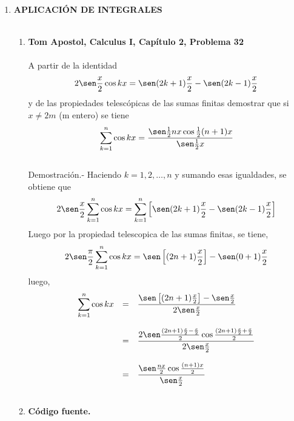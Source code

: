 \begin{enumerate}

\item \textbf{\large APLICACIÓN DE INTEGRALES}\\\\

    \begin{enumerate}[\bfseries a)]

	\item \textbf{\large Tom Apostol, Calculus I, Capítulo 2, Problema 32}\\\\
	A partir de la identidad 
	    $$2\sen \dfrac{x}{2} \cos kx = \sen(2k+1)\dfrac{x}{2} - \sen(2k-1)\dfrac{x}{2}$$
	    y de las propiedades telescópicas de las sumas finitas demostrar que si $x\neq 2m$ (m entero) se tiene
	    $$\sum_{k=1}^n \cos kx = \dfrac{\sen \frac{1}{2}nx\cos \frac{1}{2}(n+1)x}{\sen\frac{1}{2}x}$$\\
	    Demostración.-\; Haciendo $k= 1,2,\ldots, n$ y sumando esas igualdades, se obtiene que
	    $$2\sen \dfrac{x}{2} \sum_{k=1}^n \cos kx = \sum_{k=1}^n \left[\sen(2k+1)\dfrac{x}{2} - \sen(2k-1)\dfrac{x}{2}\right]$$
	    Luego por la propiedad telescopica de las sumas finitas, se tiene, 
	    $$2\sen\dfrac{\pi}{2}\sum\limits_{k=1}^n \cos kx = \sen \left[(2n+1)\dfrac{x}{2}\right]-\sen(0+1)\dfrac{x}{2}$$
	    luego,
	    $$\begin{array}{rcl}
		\displaystyle\sum_{k=1}^n \cos kx&=&\dfrac{\sen \left[(2n+1)\frac{x}{2}\right]-\sen\frac{x}{2}}{2\sen \frac{x}{2}}\\\\
						 &=&\dfrac{2\sen\frac{(2n+1)\frac{x}{2}-\frac{x}{2}}{2}\cos \frac{(2n+1)\frac{x}{2}+\frac{x}{2}}{2}}{2\sen\frac{x}{2}}\\\\
						 &=&\dfrac{\sen\frac{nx}{2}\cos\frac{(n+1)x}{2}}{\sen\frac{x}{2}}\\\\
	    \end{array}$$

	\item \textbf{Código fuente.}\\ 
	    
	    
	    \vspace{.5cm}
	

\end{enumerate}
\end{enumerate}
